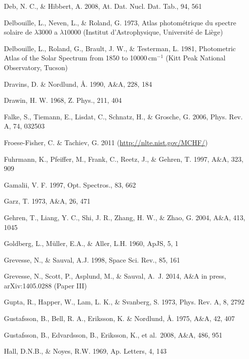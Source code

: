 \documentclass[traditabstract]{aa}
\begin{document}
\begin{thebibliography}{}
  Deb, N. C., \& Hibbert, A. 2008, At. Dat. Nucl. Dat. Tab., 94, 561

  Delbouille, L., Neven, L., \& Roland, G. 1973, Atlas photom{\'e}trique du spectre solaire de $\lambda 3000$ a $\lambda 10000$ (Institut d'Astrophysique, Universit\'e de Li\`ege)

  Delbouille, L., Roland, G., Brault, J. W., \& Testerman, L. 1981, Photometric Atlas of the Solar Spectrum from 1850 to 10000\,cm$^{-1}$ (Kitt Peak National Observatory, Tucson)
 
  Dravins, D. \& Nordlund, {\AA}. 1990, A\&A, 228, 184

  Drawin, H. W. 1968, Z. Phys., 211, 404

  Falke, S., Tiemann, E., Lisdat, C., Schnatz, H., \& Grosche, G. 2006, Phys. Rev. A, 74, 032503

  Froese-Fisher, C. \& Tachiev, G. 2011 (\href{http://nlte.nist.gov/MCHF/}{http://nlte.nist.gov/MCHF/})

  Fuhrmann, K., Pfeiffer, M., Frank, C., Reetz, J., \& Gehren, T. 1997, A\&A, 323, 909

  Gamalii, V. F. 1997, Opt. Spectros., 83, 662

  Garz, T. 1973, A\&A, 26, 471

  Gehren, T., Liang, Y. C., Shi, J. R., Zhang, H. W., \& Zhao, G. 2004, A\&A, 413, 1045
 
  Goldberg, L., M\"uller, E.A., \& Aller, L.H. 1960, ApJS, 5, 1

  Grevesse, N., \& Sauval, A.J. 1998, Space Sci. Rev., 85, 161
 
  {Grevesse}, N., {Scott}, P., {Asplund}, M., \& Sauval, A.~J. 2014, A\&A in press, arXiv:1405.0288 (Paper III)

  Gupta, R., Happer, W., Lam, L. K., \& Svanberg, S. 1973, Phys. Rev. A, 8, 2792

  Gustafsson, B., Bell, R. A., Eriksson, K. \& Nordlund, {\AA}. 1975, A\&A, 42, 407

  Gustafsson, B., Edvardsson, B., Eriksson, K., et al.\ 2008, A\&A, 486, 951

  Hall, D.N.B., \& Noyes, R.W. 1969, Ap. Letters, 4, 143


\end{thebibliography}
\end{document}
